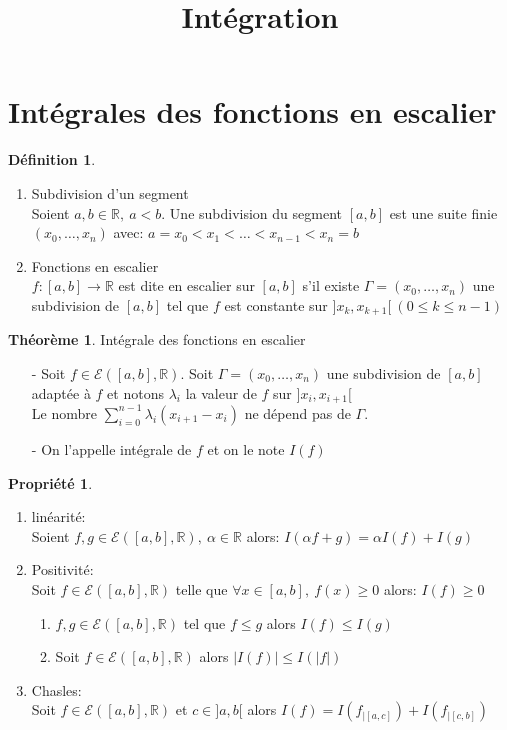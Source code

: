 \documentclass[fleqn]{article}
\title{Int\'egration}
\date{}
\theoremstyle{definition} \newtheorem*{defi}{D\'efinition}
\theoremstyle{definition} \newtheorem*{theo}{Th\'eor\`eme}
\theoremstyle{definition} \newtheorem*{coro}{Corollaire}
\theoremstyle{remark} \newtheorem*{rqs}{Remarques}
\theoremstyle{definition} \newtheorem*{prop}{Propri\'et\'e}
\begin{document}
\maketitle

\section{Int\'egrales des fonctions en escalier}
\begin{defi} $ $
\begin{enumerate}
	\item Subdivision d'un segment \\
		Soient $a, b\in \mathbb{R},\ a<b$. Une subdivision du segment $[a,b]$ est une suite finie $(x_0, \hdots, x_n)$ avec: $a=x_0 < x_1 < \hdots < x_{n-1} <  x_n = b$

	\item Fonctions en escalier\\
		$f: [a,b] \rightarrow \mathbb{R}$ est dite en escalier sur $[a,b]$ s'il existe $\Gamma = (x_0, \hdots, x_n)$ une subdivision de $[a,b]$
		tel que $f$ est constante sur $]x_k, x_{k+1}[\ (0 \leq k \leq n-1)$
\end{enumerate}
\end{defi}

\begin{theo} Int\'egrale des fonctions en escalier
	\begin{itemize}
	\item [-] Soit $f \in \mathcal{E}([a,b], \mathbb{R})$. Soit $\Gamma = (x_0, \hdots, x_n)$ une subdivision de $[a,b]$ adapt\'ee \`a $f$ et
		notons $\lambda_i$ la valeur de $f$ sur $]x_i, x_{i+1}[$ \\
		Le nombre $\sum_{i = 0}^{n-1} \lambda_i (x_{i+1} - x_i)$ ne d\'epend pas de $\Gamma$.
	\item [-] On l'appelle int\'egrale de $f$ et on le note $I(f)$
	\end{itemize}
\end{theo}

\begin{prop} $ $
	\begin{enumerate}
		\item lin\'earit\'e: \\
			Soient $f,g \in \mathcal{E}([a,b], \mathbb{R}),\ \alpha \in \mathbb{R}$ alors: $I(\alpha f + g) = \alpha I(f) + I(g)$
		\item Positivit\'e: \\
			Soit $f \in \mathcal{E}([a,b], \mathbb{R})$ telle que $\forall x \in [a,b],\ f(x) \geq 0$ alors: $I(f) \geq 0$
			\begin{enumerate}
				\item $f,g \in \mathcal{E}([a,b], \mathbb{R})$ tel que $f \leq g$ alors $I(f) \leq I(g)$
				\item Soit $f \in \mathcal{E}([a,b], \mathbb{R})$ alors $|I(f)| \leq I(|f|)$
			\end{enumerate}
		\item Chasles: \\
			Soit $f \in \mathcal{E}([a,b], \mathbb{R})$ et $c \in ]a,b[$ alors $I(f) = I(f_{|[a,c]}) + I(f_{|[c,b]})$
	\end{enumerate}
\end{prop}
\end{document}
